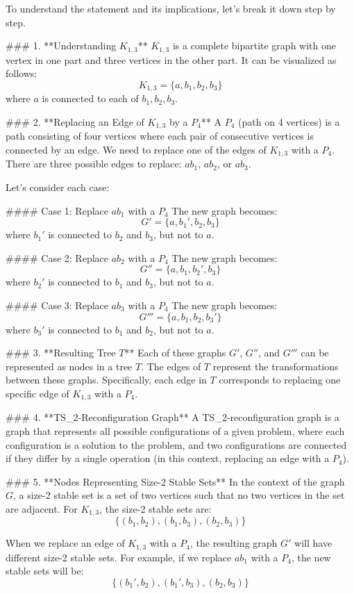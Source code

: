 To understand the statement and its implications, let's break it down step by step.

### 1. **Understanding \(K_{1,3}\)**
\(K_{1,3}\) is a complete bipartite graph with one vertex in one part and three vertices in the other part. It can be visualized as follows:
\[
K_{1,3} = \{a, b_1, b_2, b_3\}
\]
where \(a\) is connected to each of \(b_1, b_2, b_3\).

### 2. **Replacing an Edge of \(K_{1,3}\) by a \(P_4\)**
A \(P_4\) (path on 4 vertices) is a path consisting of four vertices where each pair of consecutive vertices is connected by an edge. We need to replace one of the edges of \(K_{1,3}\) with a \(P_4\). There are three possible edges to replace: \(ab_1\), \(ab_2\), or \(ab_3\).

Let's consider each case:

#### Case 1: Replace \(ab_1\) with a \(P_4\)
The new graph becomes:
\[
G' = \{a, b_1', b_2, b_3\}
\]
where \(b_1'\) is connected to \(b_2\) and \(b_3\), but not to \(a\).

#### Case 2: Replace \(ab_2\) with a \(P_4\)
The new graph becomes:
\[
G'' = \{a, b_1, b_2', b_3\}
\]
where \(b_2'\) is connected to \(b_1\) and \(b_3\), but not to \(a\).

#### Case 3: Replace \(ab_3\) with a \(P_4\)
The new graph becomes:
\[
G''' = \{a, b_1, b_2, b_3'\}
\]
where \(b_3'\) is connected to \(b_1\) and \(b_2\), but not to \(a\).

### 3. **Resulting Tree \(T\)**
Each of these graphs \(G'\), \(G''\), and \(G'''\) can be represented as nodes in a tree \(T\). The edges of \(T\) represent the transformations between these graphs. Specifically, each edge in \(T\) corresponds to replacing one specific edge of \(K_{1,3}\) with a \(P_4\).

### 4. **TS_2-Reconfiguration Graph**
A TS_2-reconfiguration graph is a graph that represents all possible configurations of a given problem, where each configuration is a solution to the problem, and two configurations are connected if they differ by a single operation (in this context, replacing an edge with a \(P_4\)).

### 5. **Nodes Representing Size-2 Stable Sets**
In the context of the graph \(G\), a size-2 stable set is a set of two vertices such that no two vertices in the set are adjacent. For \(K_{1,3}\), the size-2 stable sets are:
\[
\{(b_1, b_2), (b_1, b_3), (b_2, b_3)\}
\]

When we replace an edge of \(K_{1,3}\) with a \(P_4\), the resulting graph \(G'\) will have different size-2 stable sets. For example, if we replace \(ab_1\) with a \(P_4\), the new stable sets will be:
\[
\{(b_1', b_2), (b_1', b_3), (b_2, b_3)\}
\]

